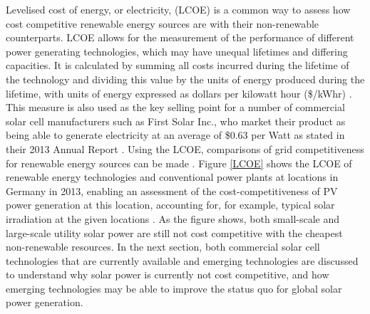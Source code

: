 \documentclass[11pt, twoside]{report}
\begin{document}

Levelised cost of energy, or electricity, (LCOE) is a common way to assess how cost competitive renewable energy sources are with their non-renewable counterparts. LCOE allows for the measurement of the performance of different power generating technologies, which may have unequal lifetimes and differing capacities. It is calculated by summing all costs incurred during the lifetime of the technology and dividing this value by the units of energy produced during the lifetime, with units of energy expressed as dollars per kilowatt hour (\$/kWhr) \cite{LCOE2}. This measure is also used as the key selling point for a number of commercial solar cell manufacturers such as First Solar Inc., who market their product as being able to generate electricity at an average of \$0.63 per Watt as stated in their 2013  Annual Report \cite{first_solar}. Using the LCOE, comparisons of grid competitiveness for renewable energy sources can be made \cite{LCOE2}. Figure \ref{LCOE} shows the LCOE of renewable energy technologies and conventional power plants at locations in Germany in 2013, enabling an assessment of the cost-competitiveness of PV power generation at this location, accounting for, for example, typical solar irradiation at the given locations \cite{LCOE}. As the figure shows, both small-scale and large-scale utility solar power are still not cost competitive with the cheapest non-renewable resources. In the next section, both commercial solar cell technologies that are currently available and emerging technologies are discussed to understand why solar power is currently not cost competitive, and how emerging technologies may be able to improve the status quo for global solar power generation.

\end{document}
